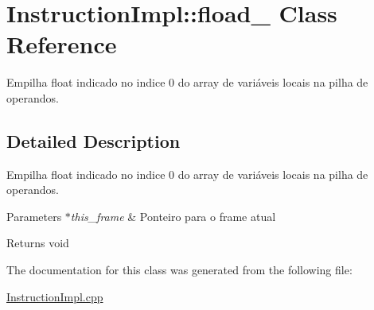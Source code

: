 \hypertarget{class_instruction_impl_1_1fload__0}{}\section{Instruction\+Impl\+:\+:fload\+\_ Class Reference}
\label{class_instruction_impl_1_1fload__0}


Empilha float indicado no indice 0 do array de variáveis locais na pilha de operandos.  




\subsection{Detailed Description}
Empilha float indicado no indice 0 do array de variáveis locais na pilha de operandos. 


\begin{DoxyParams}{Parameters}
{\em $\ast$this\+\_\+frame} & Ponteiro para o frame atual \\
\hline
\end{DoxyParams}
\begin{DoxyReturn}{Returns}
void 
\end{DoxyReturn}


The documentation for this class was generated from the following file\+:\begin{DoxyCompactItemize}
\item 
\hyperlink{_instruction_impl_8cpp}{Instruction\+Impl.\+cpp}\end{DoxyCompactItemize}
